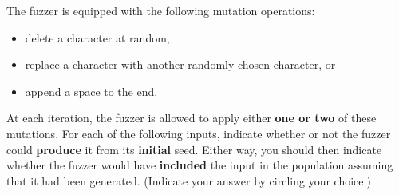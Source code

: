 \documentclass[addpoints]{exam}
\newcommand{\Code}[1]{\texttt{#1}}
\begin{document}
\begin{questions}
  The fuzzer is equipped with the following mutation operations:
  \begin{itemize}
  \item delete a character at random,
  \item replace a character with another randomly chosen character, or
  \item append a space to the end.
  \end{itemize}

  At each iteration, the fuzzer is allowed to apply either \textbf{one
    or two} of these mutations. For each of the following inputs,
  indicate whether or not the fuzzer could \textbf{produce} it from
  its \textbf{initial} seed. Either way, you should then indicate
  whether the fuzzer would have \textbf{included} the input in the
  population assuming that it had been generated. (Indicate your
  answer by circling your choice.)

\end{questions}
\end{document}
